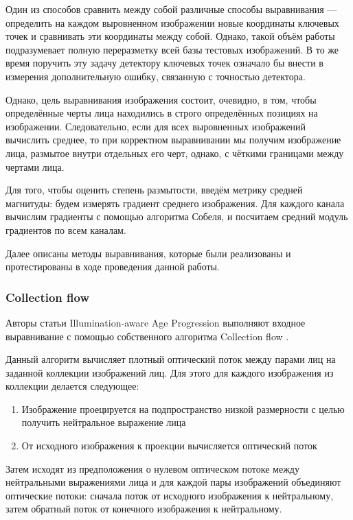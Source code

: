 Один из способов сравнить между собой различные способы выравнивания --- определить на каждом выровненном изображении новые координаты ключевых точек и сравнивать эти координаты между собой. Однако, такой объём работы подразумевает полную переразметку всей базы тестовых изображений. В то же время поручить эту задачу детектору ключевых точек означало бы внести в измерения дополнительную ошибку, связанную с точностью детектора.

Однако, цель выравнивания изображения состоит, очевидно, в том, чтобы определённые черты лица находились в строго определённых позициях на изображении. Следовательно, если для всех выровненных изображений вычислить среднее, то при корректном выравнивании мы получим изображение лица, размытое внутри отдельных его черт, однако, с чёткими границами между чертами лица.

Для того, чтобы оценить степень размытости, введём метрику средней магнитуды: будем измерять градиент среднего изображения. Для каждого канала вычислим градиенты с помощью алгоритма Собеля, и посчитаем средний модуль градиентов по всем каналам.

Далее описаны методы выравнивания, которые были реализованы и протестированы в ходе проведения данной работы.

\subsubsection{Collection flow}

Авторы статьи Illumination-aware Age Progression \cite{illumination_aware} выполняют входное выравнивание с помощью собственного алгоритма Collection flow \cite{collection_flow}.
 
Данный алгоритм вычисляет плотный оптический поток между парами лиц на заданной коллекции изображений лиц.
Для этого для каждого изображения из коллекции делается следующее:

\begin{enumerate}
  \item Изображение проецируется на подпространство низкой размерности с целью получить нейтральное выражение лица
  \item От исходного изображения к проекции вычисляется оптический поток
\end{enumerate}

Затем исходят из предположения о нулевом оптическом потоке между нейтральными выражениями лица и для каждой пары изображений объединяют оптические потоки: сначала поток от исходного изображения к нейтральному, затем обратный поток от конечного изображения к нейтральному.

